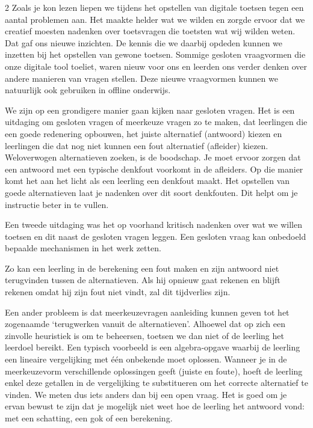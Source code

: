 \begin{multicols} {2}
Zoals je kon lezen liepen we tijdens het opstellen van digitale toetsen tegen een aantal problemen aan. Het maakte helder wat we wilden en zorgde ervoor dat we creatief moesten nadenken over toetsvragen die toetsten wat wij wilden weten. Dat gaf ons nieuwe inzichten. De kennis die we daarbij opdeden kunnen we inzetten bij het opstellen van gewone toetsen. Sommige gesloten vraagvormen die onze digitale tool toeliet, waren nieuw voor ons en leerden ons verder denken over andere manieren van vragen stellen. Deze nieuwe vraagvormen kunnen we natuurlijk ook gebruiken in offline onderwijs.

We zijn op een grondigere manier gaan kijken naar gesloten vragen. Het is een uitdaging om gesloten vragen of meerkeuze vragen zo te maken, dat leerlingen die een goede redenering opbouwen, het juiste alternatief (antwoord) kiezen en leerlingen die dat nog niet kunnen een fout alternatief (afleider) kiezen. Weloverwogen alternatieven zoeken, is de boodschap. Je moet ervoor zorgen dat een antwoord met een typische denkfout voorkomt in de afleiders. Op die manier komt het aan het licht als een leerling een denkfout maakt. Het opstellen van goede alternatieven laat je nadenken over dit soort denkfouten. Dit helpt om je instructie beter in te vullen.

Een tweede uitdaging was het op voorhand kritisch nadenken over wat we willen toetsen en dit naast de gesloten vragen leggen. Een gesloten vraag kan onbedoeld bepaalde mechanismen in het werk zetten. 

Zo kan een leerling in de berekening een fout maken en zijn antwoord niet terugvinden tussen de alternatieven. Als hij opnieuw gaat rekenen en blijft rekenen omdat hij zijn fout niet vindt, zal dit tijdverlies zijn. 

Een ander probleem is dat meerkeuzevragen aanleiding kunnen geven tot het zogenaamde `terugwerken vanuit de alternatieven'. Alhoewel dat op zich een zinvolle heuristiek is om te beheersen, toetsen we dan niet of de leerling het leerdoel bereikt. Een typisch voorbeeld is een algebra-opgave waarbij de leerling een lineaire vergelijking met één onbekende moet oplossen. Wanneer je in de meerkeuzevorm verschillende oplossingen geeft (juiste en foute), hoeft de leerling enkel deze getallen in de vergelijking te substitueren om het correcte alternatief te vinden. We meten dus iets anders dan bij een open vraag. Het is goed om je ervan bewust te zijn dat je mogelijk niet weet hoe de leerling het antwoord vond: met een schatting, een gok of een berekening.


\end{multicols}
